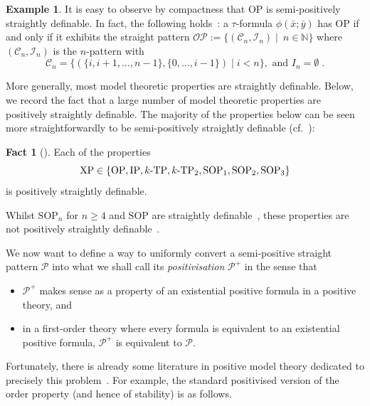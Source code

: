 \documentclass{amsart}
\theoremstyle{definition}
\newtheorem{example}[theorem]{Example}
\newtheorem{fact}[theorem]{Fact}
\theoremstyle{remark}
\numberwithin{equation}{section}
\newcommand{\pau}[1]{\textcolor{blue}{#1}}
\begin{document}
\begin{example} It is easy to observe by compactness that $\mathrm{OP}$ is 
semi-positively straightly definable. In fact, the following holds~\cite{bailetti2024walk}: a $\tau$-formula $\phi(\bar{x};\bar{y})$ has $\mathrm{OP}$ if and only if it exhibits the straight pattern $\mathcal{OP}:=\{(\mathcal{C}_n, \mathcal{I}_n)\mid \ n\in\mathbb{N}\}$ where $(\mathcal{C}_n, \mathcal{I}_n)$ is the $n$-pattern with
\[\mathcal{C}_n =\{(\{i,i +1,\dots,n -1\},\{0,\dots,i-1\}) \mid i < n\}, \text{ and } I_n =\emptyset\;.\]
\end{example}
More generally, most model theoretic properties are straightly definable. Below, we record the fact that a large number of model theoretic properties are positively straightly definable. The majority of the properties below can be seen more straightforwardly to be semi-positively straightly definable (cf.~\cite[Proposition 3.3]{bailetti2024walk}):


\begin{fact}[\cite{bailetti2024walk, day2025results, shelah2008more}] Each of the properties 
\[\mathrm{XP}\in\{\mathrm{OP}, \mathrm{IP}, k\textnormal{-}\mathrm{TP}, k\textnormal{-}\mathrm{TP}_2, \mathrm{SOP}_1, \mathrm{SOP}_2, \mathrm{SOP}_3\} \]
is positively straightly definable. 
\end{fact}
Whilst $\mathrm{SOP}_n$ for $n\geq 4$ and $\mathrm{SOP}$ are straightly definable~\cite{bailetti2024walk, day2026notion}, these properties are not positively straightly definable~\cite{bailetti2024walk}.%


We now want to define a way to uniformly convert a semi-positive straight pattern $\mathcal{P}$ into what {we} shall call its \emph{positivisation} $\mathcal{P}^+$ in the sense that
\begin{itemize}
    \item $\mathcal{P}^+$ makes sense as a property of an existential positive formula in a positive theory, and  
    \item in a first-order theory where every formula is equivalent to an existential positive formula, $\mathcal{P}^+$ is equivalent to $\mathcal{P}$. 
\end{itemize}
    Fortunately, there is already some literature in positive model theory dedicated to precisely this problem~\cite{PosModT}.
    For example, the standard positivised version of the order property (and hence of stability) is as follows. 
\end{document}
